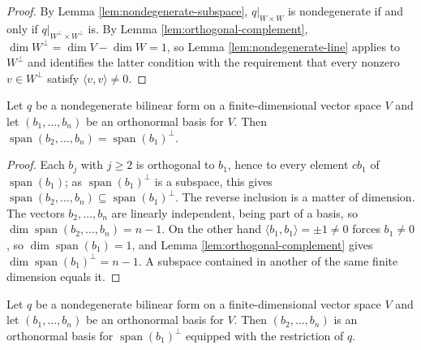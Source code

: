 \begin{proof}
\leanok
{}
By Lemma \ref{lem:nondegenerate-subspace}, $q|_{W\times W}$ is nondegenerate if and only if $q|_{W^\perp \times W^\perp}$ is. By Lemma \ref{lem:orthogonal-complement}, $\dim W^\perp = \dim V - \dim W = 1$, so Lemma \ref{lem:nondegenerate-line} applies to $W^\perp$ and identifies the latter condition with the requirement that every nonzero $v \in W^\perp$ satisfy $\langle v,v \rangle \neq 0$.
\end{proof}

\begin{lemma}
\label{lem:orthonormal-tail-spans-orthogonal}
\leanok
{}
Let $q$ be a nondegenerate bilinear form on a finite-dimensional vector space $V$ and let $(b_1,\ldots,b_n)$ be an orthonormal basis for $V$. Then $\operatorname{span}(b_2,\ldots,b_n) = \operatorname{span}(b_1)^\perp$.
\end{lemma}

\begin{proof}
\leanok
{}
Each $b_j$ with $j \geq 2$ is orthogonal to $b_1$, hence to every element $cb_1$ of $\operatorname{span}(b_1)$; as $\operatorname{span}(b_1)^\perp$ is a subspace, this gives $\operatorname{span}(b_2,\ldots,b_n) \subseteq \operatorname{span}(b_1)^\perp$. The reverse inclusion is a matter of dimension. The vectors $b_2,\ldots,b_n$ are linearly independent, being part of a basis, so $\dim\operatorname{span}(b_2,\ldots,b_n) = n-1$. On the other hand $\langle b_1,b_1\rangle = \pm 1 \neq 0$ forces $b_1 \neq 0$, so $\dim \operatorname{span}(b_1) = 1$, and Lemma \ref{lem:orthogonal-complement} gives $\dim \operatorname{span}(b_1)^\perp = n-1$. A subspace contained in another of the same finite dimension equals it.
\end{proof}

\begin{lemma}
\label{lem:orthonormal-basis-orthogonal-complement}
\leanok
{}
Let $q$ be a nondegenerate bilinear form on a finite-dimensional vector space $V$ and let $(b_1,\ldots,b_n)$ be an orthonormal basis for $V$. Then $(b_2,\ldots,b_n)$ is an orthonormal basis for $\operatorname{span}(b_1)^\perp$ equipped with the restriction of $q$.
\end{lemma}

